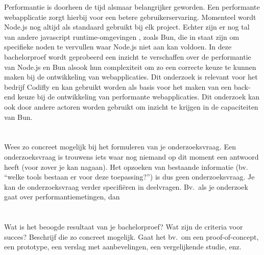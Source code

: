 Performantie is doorheen de tijd alsmaar belangrijker geworden. 
Een performante webapplicatie zorgt hierbij voor een betere gebruikerservaring. 
Momenteel wordt Node.js nog altijd als standaard gebruikt bij elk project. Echter zijn er nog tal van andere javascript runtime-omgevingen
, zoals Bun, die in staat zijn om specifieke noden te vervullen waar Node.js niet aan kan voldoen. In deze bachelorproef wordt geprobeerd 
een inzicht te verschaffen over de performantie van Node.js en Bun alsook hun complexiteit 
om zo een correcte keuze te kunnen maken bij de ontwikkeling van webapplicaties.
Dit onderzoek is relevant voor het bedrijf Codifly en kan gebruikt worden als basis 
voor het maken van een back-end keuze bij de ontwikkeling van performante webapplicaties. Dit onderzoek kan 
ook door andere actoren worden gebruikt om inzicht te krijgen in de capaciteiten van Bun.

\section{}%
\label{sec:onderzoeksvraag}

Wees zo concreet mogelijk bij het formuleren van je onderzoeksvraag. Een onderzoeksvraag is trouwens iets waar nog niemand op dit moment een antwoord heeft (voor zover je kan nagaan). Het opzoeken van bestaande informatie (bv. ``welke tools bestaan er voor deze toepassing?'') is dus geen onderzoeksvraag. Je kan de onderzoeksvraag verder specifiëren in deelvragen. Bv.~als je onderzoek gaat over performantiemetingen, dan 

\section{}%
\label{sec:onderzoeksdoelstelling}

Wat is het beoogde resultaat van je bachelorproef? Wat zijn de criteria voor succes? Beschrijf die zo concreet mogelijk. Gaat het bv.\ om een proof-of-concept, een prototype, een verslag met aanbevelingen, een vergelijkende studie, enz.

\section{}%
\label{sec:opzet-bachelorproef}

